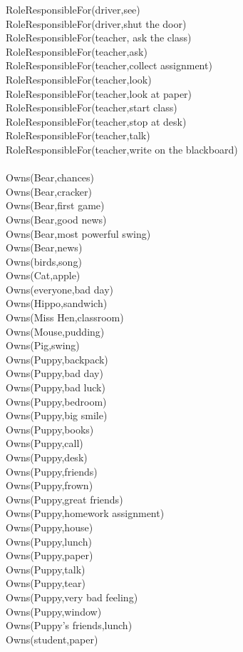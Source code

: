 \begin{multicols}{2}
\begin{footnotesize}
RoleResponsibleFor(driver,see) \\
RoleResponsibleFor(driver,shut the door) \\
RoleResponsibleFor(teacher, ask the class) \\
RoleResponsibleFor(teacher,ask) \\
RoleResponsibleFor(teacher,collect assignment) \\
RoleResponsibleFor(teacher,look) \\
RoleResponsibleFor(teacher,look at paper) \\
RoleResponsibleFor(teacher,start class) \\
RoleResponsibleFor(teacher,stop at desk) \\
RoleResponsibleFor(teacher,talk) \\
RoleResponsibleFor(teacher,write on the blackboard) \\
~\\
Owns(Bear,chances) \\
Owns(Bear,cracker) \\
Owns(Bear,first game) \\
Owns(Bear,good news) \\
Owns(Bear,most powerful swing) \\
Owns(Bear,news) \\
Owns(birds,song) \\
Owns(Cat,apple) \\
Owns(everyone,bad day) \\
Owns(Hippo,sandwich) \\
Owns(Miss Hen,classroom) \\
Owns(Mouse,pudding) \\
Owns(Pig,swing) \\
Owns(Puppy,backpack) \\
Owns(Puppy,bad day) \\
Owns(Puppy,bad luck) \\
Owns(Puppy,bedroom) \\
Owns(Puppy,big smile) \\
Owns(Puppy,books) \\
Owns(Puppy,call) \\
Owns(Puppy,desk) \\
Owns(Puppy,friends) \\
Owns(Puppy,frown) \\
Owns(Puppy,great friends) \\
Owns(Puppy,homework assignment) \\
Owns(Puppy,house) \\
Owns(Puppy,lunch) \\
Owns(Puppy,paper) \\
Owns(Puppy,talk) \\
Owns(Puppy,tear) \\
Owns(Puppy,very bad feeling) \\
Owns(Puppy,window) \\
Owns(Puppy's friends,lunch) \\
Owns(student,paper) \\
\end{footnotesize}
\end{multicols}

